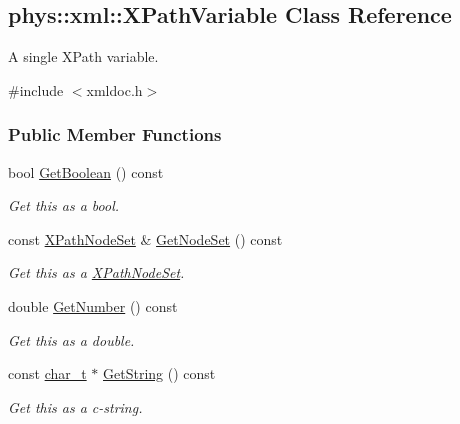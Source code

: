\hypertarget{classphys_1_1xml_1_1XPathVariable}{
\subsection{phys::xml::XPathVariable Class Reference}
\label{classphys_1_1xml_1_1XPathVariable}
}


A single XPath variable.  




{\ttfamily \#include $<$xmldoc.h$>$}

\subsubsection*{Public Member Functions}
\begin{DoxyCompactItemize}
\item 
bool \hyperlink{classphys_1_1xml_1_1XPathVariable_ade5e5da86817afc6fafd64d4f9b21e9c}{GetBoolean} () const 
\begin{DoxyCompactList}\small\item\em Get this as a bool. \item\end{DoxyCompactList}\item 
const \hyperlink{classphys_1_1xml_1_1XPathNodeSet}{XPathNodeSet} \& \hyperlink{classphys_1_1xml_1_1XPathVariable_a773036e3c3c3db0af26fa662782f7e56}{GetNodeSet} () const 
\begin{DoxyCompactList}\small\item\em Get this as a \hyperlink{classphys_1_1xml_1_1XPathNodeSet}{XPathNodeSet}. \item\end{DoxyCompactList}\item 
double \hyperlink{classphys_1_1xml_1_1XPathVariable_ac3798fc142b781c48bd694f1cdd386c4}{GetNumber} () const 
\begin{DoxyCompactList}\small\item\em Get this as a double. \item\end{DoxyCompactList}\item 
const \hyperlink{namespacephys_1_1xml_afc87705cd1c2917d87b879715a2d8f6e}{char\_\-t} $\ast$ \hyperlink{classphys_1_1xml_1_1XPathVariable_a5354bcb8e5c2ffa6ececcf259049338b}{GetString} () const 
\begin{DoxyCompactList}\small\item\em Get this as a c-\/string. \item\end{DoxyCompactList}\item 

\end{DoxyCompactItemize}
